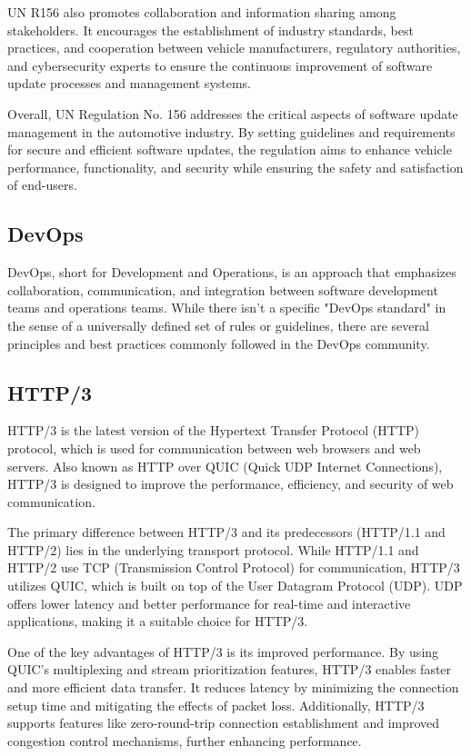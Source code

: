 \documentclass[
12pt,
oneside, 
onehalfspacing, 
nolistspacing, 
parskip, 
chapterinoneline, 
]{AASTCOMPUTER}
\begin{document}
UN R156 also promotes collaboration and information sharing among stakeholders. It encourages the establishment of industry standards, best practices, and cooperation between vehicle manufacturers, regulatory authorities, and cybersecurity experts to ensure the continuous improvement of software update processes and management systems.

Overall, UN Regulation No. 156 addresses the critical aspects of software update management in the automotive industry. By setting guidelines and requirements for secure and efficient software updates, the regulation aims to enhance vehicle performance, functionality, and security while ensuring the safety and satisfaction of end-users.


\subsection{DevOps}

DevOps, short for Development and Operations, is an approach that emphasizes collaboration, communication, and integration between software development teams and operations teams. While there isn't a specific "DevOps standard" in the sense of a universally defined set of rules or guidelines, there are several principles and best practices commonly followed in the DevOps community.


\subsection{HTTP/3}

HTTP/3 is the latest version of the Hypertext Transfer Protocol (HTTP) protocol, which is used for communication between web browsers and web servers. Also known as HTTP over QUIC (Quick UDP Internet Connections), HTTP/3 is designed to improve the performance, efficiency, and security of web communication.

The primary difference between HTTP/3 and its predecessors (HTTP/1.1 and HTTP/2) lies in the underlying transport protocol. While HTTP/1.1 and HTTP/2 use TCP (Transmission Control Protocol) for communication, HTTP/3 utilizes QUIC, which is built on top of the User Datagram Protocol (UDP). UDP offers lower latency and better performance for real-time and interactive applications, making it a suitable choice for HTTP/3.

One of the key advantages of HTTP/3 is its improved performance. By using QUIC's multiplexing and stream prioritization features, HTTP/3 enables faster and more efficient data transfer. It reduces latency by minimizing the connection setup time and mitigating the effects of packet loss. Additionally, HTTP/3 supports features like zero-round-trip connection establishment and improved congestion control mechanisms, further enhancing performance.
\end{document}
